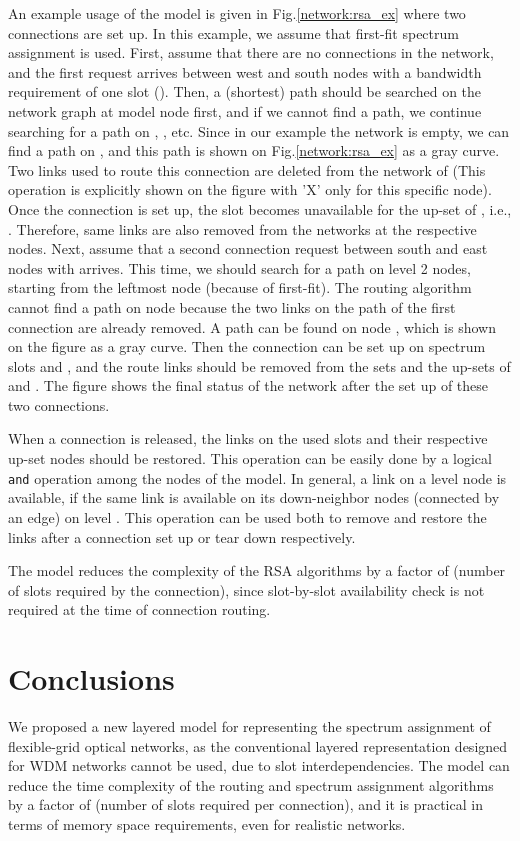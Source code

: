 \documentclass[letterpaper,10pt]{article}\pdfoutput=1
\begin{document}
An example usage of the model is given in Fig.\ref{network:rsa_ex} where two connections are set up.
In this example, we assume that first-fit spectrum assignment is used.
First, assume that there are no connections in the network, and the first request arrives between west and south
nodes with a bandwidth 
requirement of one slot (). Then, a (shortest) path should be searched on the network graph at model node 
 first, and if
we cannot find a path, we continue searching for a path on , , etc. Since in our example the
network is empty, we can find a path on , and this path is shown on Fig.\ref{network:rsa_ex} as a gray
curve. Two links used to route this connection are deleted from the network of  (This operation is 
explicitly shown on the figure with 'X' only for this specific node). 
Once the connection is set up, the slot  becomes unavailable
for the up-set of , i.e., . Therefore, same links are also removed 
from the networks at the respective nodes. Next,
assume that a second connection request between south and east nodes with  arrives.
This time, we should search for a path on level 2 nodes, starting from the leftmost node (because of 
first-fit). The routing algorithm cannot find a path on node  because the two links on the path of
the first connection are already removed. A path can be found on node , which is shown on the figure
as a gray curve. Then the connection can be set up on spectrum slots  and , and the route links should
be removed from the sets and the up-sets of  and . 
The figure shows the final status of the network after the set up of these two connections.

When a connection is released, the links on the used slots and their respective up-set nodes should be restored.
This operation can be easily done by a logical \texttt{and} operation among the nodes of the model. 
In general, a link on a level  node is 
available, if the same link is available on its down-neighbor nodes (connected by an edge) on level .
This operation can be used both to remove and restore the links after a connection set up or 
tear down respectively. 

The model reduces the complexity of the RSA algorithms by a factor of  (number of slots required by the 
connection), since slot-by-slot availability check is not required at the time of connection routing.

\section{Conclusions}
We proposed a new layered model for representing the spectrum assignment of flexible-grid optical networks, as the 
conventional layered representation designed for WDM networks cannot be used, due to slot interdependencies. 
The model can reduce the time complexity of the routing and spectrum assignment algorithms by a factor of  
(number of slots required per connection), and it is practical in terms of memory space requirements, even for
realistic networks. 
\end{document}
